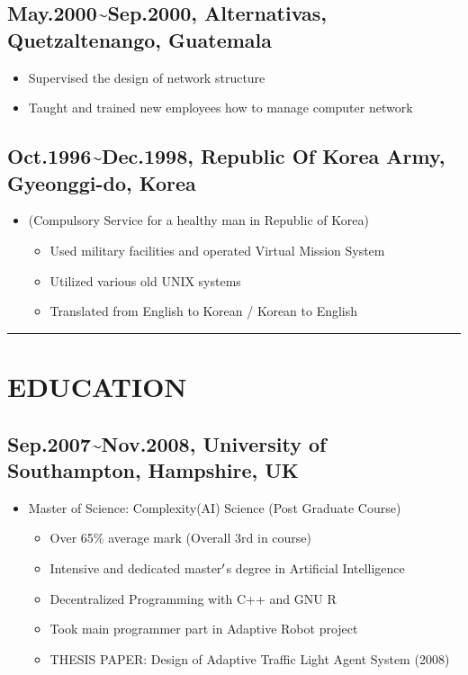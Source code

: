 \documentclass[12pt,a4paper]{article}
\begin{document}
\subsection{May.2000{\textasciitilde}Sep.2000, Alternativas, Quetzaltenango, Guatemala}
\begin{itemize}
\item Supervised the design of network structure


\item Taught and trained new employees how to manage computer network

\end{itemize}
\subsection{Oct.1996{\textasciitilde}Dec.1998, Republic Of Korea Army, Gyeonggi-do, Korea}
\begin{itemize}
\item (Compulsory Service for a healthy man in Republic of Korea)

\begin{itemize}
\item Used military facilities and operated Virtual Mission System


\item Utilized various old UNIX systems


\item Translated from English to Korean / Korean to English

\end{itemize}
\end{itemize}
\rule{\textwidth}{1pt}
\section{EDUCATION}
\subsection{Sep.2007{\textasciitilde}Nov.2008, University of Southampton, Hampshire, UK}
\begin{itemize}
\item Master of Science: Complexity(AI) Science (Post Graduate Course)

\begin{itemize}
\item Over 65\% average mark (Overall 3rd in course)


\item Intensive and dedicated master\ensuremath{\rq}s degree in Artificial Intelligence


\item Decentralized Programming with C++ and GNU R


\item Took main programmer part in Adaptive Robot project


\item THESIS PAPER: Design of Adaptive Traffic Light Agent System (2008)

\end{itemize}
\end{itemize}
\end{document}
